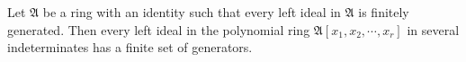 Let $\mathfrak{A}$ be a ring with an identity such that every left ideal in $\mathfrak{A}$ is finitely generated. Then every left ideal in the polynomial ring $\mathfrak{A}[x_1, x_2, \cdots, x_r]$ in several indeterminates has a finite set of generators.
